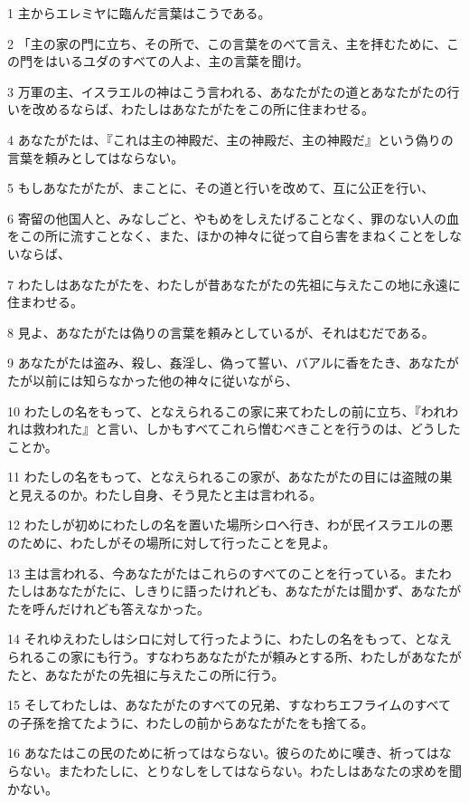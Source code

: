 \par 1 主からエレミヤに臨んだ言葉はこうである。
\par 2 「主の家の門に立ち、その所で、この言葉をのべて言え、主を拝むために、この門をはいるユダのすべての人よ、主の言葉を聞け。
\par 3 万軍の主、イスラエルの神はこう言われる、あなたがたの道とあなたがたの行いを改めるならば、わたしはあなたがたをこの所に住まわせる。
\par 4 あなたがたは、『これは主の神殿だ、主の神殿だ、主の神殿だ』という偽りの言葉を頼みとしてはならない。
\par 5 もしあなたがたが、まことに、その道と行いを改めて、互に公正を行い、
\par 6 寄留の他国人と、みなしごと、やもめをしえたげることなく、罪のない人の血をこの所に流すことなく、また、ほかの神々に従って自ら害をまねくことをしないならば、
\par 7 わたしはあなたがたを、わたしが昔あなたがたの先祖に与えたこの地に永遠に住まわせる。
\par 8 見よ、あなたがたは偽りの言葉を頼みとしているが、それはむだである。
\par 9 あなたがたは盗み、殺し、姦淫し、偽って誓い、バアルに香をたき、あなたがたが以前には知らなかった他の神々に従いながら、
\par 10 わたしの名をもって、となえられるこの家に来てわたしの前に立ち、『われわれは救われた』と言い、しかもすべてこれら憎むべきことを行うのは、どうしたことか。
\par 11 わたしの名をもって、となえられるこの家が、あなたがたの目には盗賊の巣と見えるのか。わたし自身、そう見たと主は言われる。
\par 12 わたしが初めにわたしの名を置いた場所シロへ行き、わが民イスラエルの悪のために、わたしがその場所に対して行ったことを見よ。
\par 13 主は言われる、今あなたがたはこれらのすべてのことを行っている。またわたしはあなたがたに、しきりに語ったけれども、あなたがたは聞かず、あなたがたを呼んだけれども答えなかった。
\par 14 それゆえわたしはシロに対して行ったように、わたしの名をもって、となえられるこの家にも行う。すなわちあなたがたが頼みとする所、わたしがあなたがたと、あなたがたの先祖に与えたこの所に行う。
\par 15 そしてわたしは、あなたがたのすべての兄弟、すなわちエフライムのすべての子孫を捨てたように、わたしの前からあなたがたをも捨てる。
\par 16 あなたはこの民のために祈ってはならない。彼らのために嘆き、祈ってはならない。またわたしに、とりなしをしてはならない。わたしはあなたの求めを聞かない。
